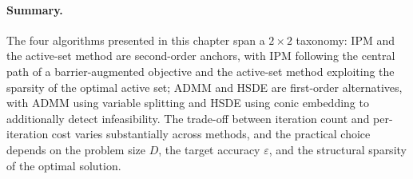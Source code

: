 \paragraph{Summary.} The four algorithms presented in this chapter span a $2\times2$ taxonomy: IPM and the active-set method are second-order anchors, with IPM following the central path of a barrier-augmented objective and the active-set method exploiting the sparsity of the optimal active set; ADMM and HSDE are first-order alternatives, with ADMM using variable splitting and HSDE using conic embedding to additionally detect infeasibility. The trade-off between iteration count and per-iteration cost varies substantially across methods, and the practical choice depends on the problem size $D$, the target accuracy $\varepsilon$, and the structural sparsity of the optimal solution.

\newpage
